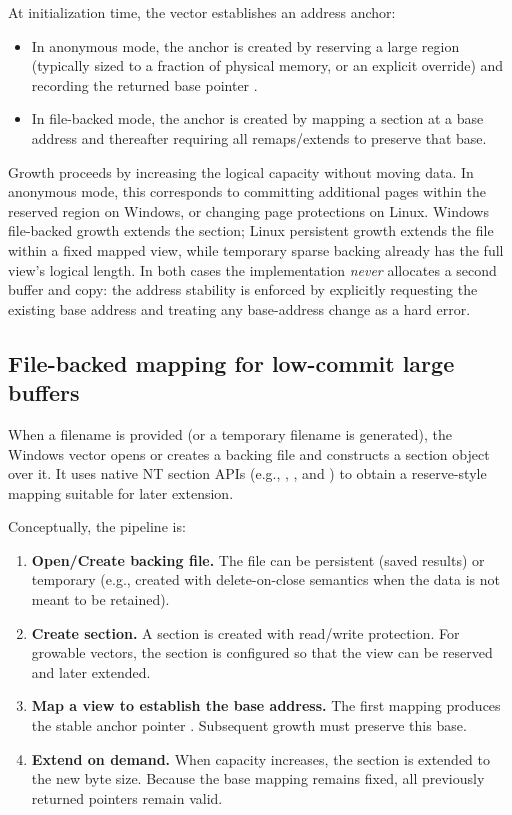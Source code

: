 At initialization time, the vector establishes an address anchor:
\begin{itemize}
  \item In anonymous mode, the anchor is created by reserving a large region
  (typically sized to a fraction of physical memory, or an explicit override)
  and recording the returned base pointer .
  \item In file-backed mode, the anchor is created by mapping a section at a
  base address and thereafter requiring all remaps/extends to preserve that base.
\end{itemize}

Growth proceeds by increasing the logical capacity 
without moving data. In anonymous mode, this corresponds to committing
additional pages within the reserved region on Windows, or changing page
protections on Linux. Windows file-backed growth extends the section; Linux
persistent growth extends the file within a fixed mapped view, while temporary
sparse backing already has the full view's logical length. In both cases the implementation \emph{never} allocates a second buffer and
copy: the address stability is enforced by explicitly requesting the existing
base address and treating any base-address change as a hard error.

\subsection{File-backed mapping for low-commit large buffers}
\label{sec:file_backed_mapping}

When a filename is provided (or a temporary filename is generated), the Windows
vector opens or creates a backing file and constructs a section object over it. It uses
native NT section APIs (e.g., ,
, and ) to obtain a
reserve-style mapping suitable for later extension.

Conceptually, the pipeline is:
\begin{enumerate}
  \item \textbf{Open/Create backing file.} The file can be persistent (saved
  results) or temporary (e.g., created with delete-on-close semantics when the
  data is not meant to be retained).
  \item \textbf{Create section.} A section is created with read/write
  protection. For growable vectors, the section is configured so that the view
  can be reserved and later extended.
  \item \textbf{Map a view to establish the base address.} The first mapping
  produces the stable anchor pointer . Subsequent growth must
  preserve this base.
  \item \textbf{Extend on demand.} When capacity increases, the section is
  extended to the new byte size. Because the base mapping remains fixed, all
  previously returned pointers remain valid.
\end{enumerate}

